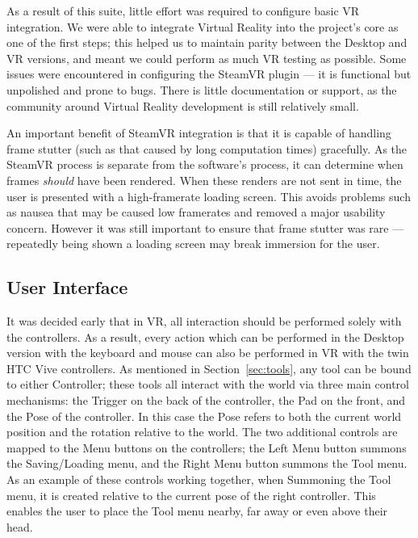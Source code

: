 As a result of this suite, little effort was required to configure basic VR integration. We were able to integrate Virtual Reality into the project's core as one of the first steps; this helped us to maintain parity between the Desktop and VR versions, and meant we could perform as much VR testing as possible. Some issues were encountered in configuring the SteamVR plugin --- it is functional but unpolished and prone to bugs. There is little documentation or support, as the community around Virtual Reality development is still relatively small. 

An important benefit of SteamVR integration is that it is capable of handling frame stutter (such as that caused by long computation times) gracefully. As the SteamVR process is separate from the software's process, it can determine when frames \textit{should} have been rendered. When these renders are not sent in time, the user is presented with a high-framerate loading screen. This avoids problems such as nausea that may be caused low framerates and removed a major usability concern. However it was still important to ensure that frame stutter was rare --- repeatedly being shown a loading screen may break immersion for the user.

\subsection{User Interface}
\label{sec:ui}

It was decided early that in VR, all interaction should be performed solely with the controllers. As a result, every action which can be performed in the Desktop version with the keyboard and mouse can also be performed in VR with the twin HTC Vive controllers. As mentioned in Section~\ref{sec:tools}, any tool can be bound to either Controller; these tools all interact with the world via three main control mechanisms: the Trigger on the back of the controller, the Pad on the front, and the Pose of the controller. In this case the Pose refers to both the current world position and the rotation relative to the world. The two additional controls are mapped to the Menu buttons on the controllers; the Left Menu button summons the Saving/Loading menu, and the Right Menu button summons the Tool menu. As an example of these controls working together, when Summoning the Tool menu, it is created relative to the current pose of the right controller. This enables the user to place the Tool menu nearby, far away or even above their head.

